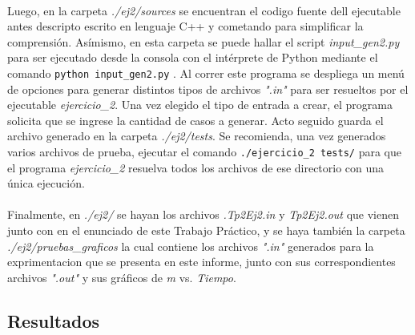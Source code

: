 \paragraph{}
Luego, en la carpeta \textit{./ej2/sources} se encuentran el codigo fuente dell ejecutable antes descripto escrito en lenguaje C++ y cometando para simplificar la comprensión. Asímismo, en esta carpeta se puede hallar el script \textit{input\_gen2.py} para ser ejecutado desde la consola con el intérprete de Python mediante el comando \texttt{python input\_gen2.py} . Al correr este programa se despliega un menú de opciones para generar distintos tipos de archivos \textit{".in"} para ser resueltos por el ejecutable \textit{ejercicio\_2}. Una vez elegido el tipo de entrada a crear, el programa solicita que se ingrese la cantidad de casos a generar. Acto seguido guarda el archivo generado en la carpeta \textit{./ej2/tests}. Se recomienda, una vez generados varios archivos de prueba, ejecutar el comando \texttt{./ejercicio\_2 tests/} para que el programa \textit{ejercicio\_2} resuelva todos los archivos de ese directorio con una única ejecución.

\paragraph{}
Finalmente, en \textit{./ej2/} se hayan los archivos \textit{.Tp2Ej2.in} y \textit{Tp2Ej2.out} que vienen junto con en el enunciado de este Trabajo Práctico, y se haya también la carpeta \textit{./ej2/pruebas\_graficos} la cual contiene los archivos \textit{".in"} generados para la exprimentacion que se presenta en este informe, junto con sus correspondientes archivos \textit{".out"} y sus gráficos de \textit{m} vs. \textit{Tiempo}.


\subsection{Resultados}
\label{res2}


